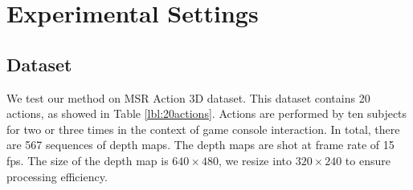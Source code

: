 \documentclass[final,3p,times,twocolumn]{elsarticle}
\begin{document}
\section{Experimental Settings}
\label{lbl:ExperimentalSettings}

\subsection{Dataset}
\label{lbl:ExperimentalSettings_Dataset}
We test our method on MSR Action 3D dataset. This dataset contains 20 actions, as showed in Table \ref{lbl:20actions}. Actions are performed by ten subjects for two or three times in the context of game console interaction. In total, there are 567 sequences of depth maps. The depth maps are shot at frame rate of 15 fps. The size of the depth map is $640 \times 480$, we resize into $320 \times 240$ to ensure processing efficiency.

\begin{table}[H]
	\begin{center}
	\end{center}
	\caption{\label{lbl:20actions}20 actions in MSR Action 3D dataset}
\end{table}
\end{document}
